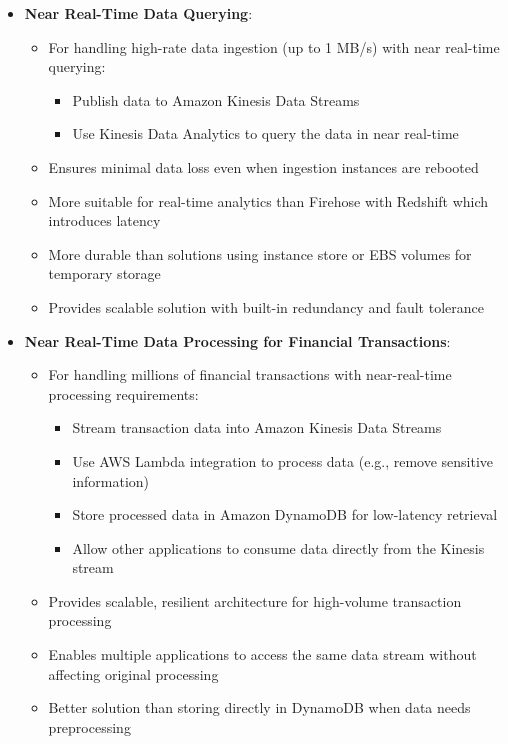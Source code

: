 \documentclass[11pt,a4paper]{report}
\begin{document}
\begin{itemize}
\begin{itemize}
  \item Provides guaranteed ordering with high throughput for streaming data
\end{itemize}
  \item \textbf{Near Real-Time Data Querying}:
\begin{itemize}
  \item For handling high-rate data ingestion (up to 1 MB/s) with near real-time querying:
\begin{itemize}
  \item Publish data to Amazon Kinesis Data Streams
  \item Use Kinesis Data Analytics to query the data in near real-time
\end{itemize}
  \item Ensures minimal data loss even when ingestion instances are rebooted
  \item More suitable for real-time analytics than Firehose with Redshift which introduces latency
  \item More durable than solutions using instance store or EBS volumes for temporary storage
  \item Provides scalable solution with built-in redundancy and fault tolerance
\end{itemize}
  \item \textbf{Near Real-Time Data Processing for Financial Transactions}:
\begin{itemize}
  \item For handling millions of financial transactions with near-real-time processing requirements:
\begin{itemize}
  \item Stream transaction data into Amazon Kinesis Data Streams
  \item Use AWS Lambda integration to process data (e.g., remove sensitive information)
  \item Store processed data in Amazon DynamoDB for low-latency retrieval
  \item Allow other applications to consume data directly from the Kinesis stream
\end{itemize}
  \item Provides scalable, resilient architecture for high-volume transaction processing
  \item Enables multiple applications to access the same data stream without affecting original processing
  \item Better solution than storing directly in DynamoDB when data needs preprocessing

\end{itemize}
\end{itemize}
\end{document}
